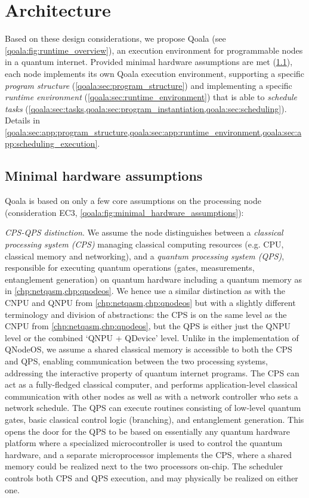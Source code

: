 \section{Architecture}
\label{qoala:sec:architecture}

Based on these design considerations, we propose Qoala (see \cref{qoala:fig:runtime_overview}), an execution environment for programmable nodes in a quantum internet. 
Provided minimal hardware assumptions are met (\cref{qoala:sec:minimal_hardware_assumptions}), 
each node implements its own Qoala execution environment, supporting a specific \textit{program structure} (\cref{qoala:sec:program_structure})
and implementing a specific \textit{runtime environment} (\cref{qoala:sec:runtime_environment}) that is able to \textit{schedule tasks} (\cref{qoala:sec:tasks,qoala:sec:program_instantiation,qoala:sec:scheduling}).
Details in \cref{qoala:sec:app:program_structure,qoala:sec:app:runtime_environment,qoala:sec:app:scheduling_execution}.

\subsection{Minimal hardware assumptions}
\label{qoala:sec:minimal_hardware_assumptions}

Qoala is based on only a few core assumptions on the processing node (consideration EC3, \cref{qoala:fig:minimal_hardware_assumptions}):

\textit{CPS-QPS distinction}. We assume the node distinguishes between a \textit{classical processing system (CPS)} managing classical computing resources (e.g. CPU, classical memory and networking), and a \textit{quantum processing system (QPS)}, responsible for executing quantum operations (gates, measurements, entanglement generation) on quantum hardware including a quantum memory as in \cref{chp:netqasm,chp:qnodeos}.
We hence use a similar distinction as with the CNPU and QNPU from \cref{chp:netqasm,chp:qnodeos} but with a slightly different terminology and division of abstractions:
the CPS is on the same level as the CNPU from \cref{chp:netqasm,chp:qnodeos}, but the QPS is either just the QNPU level or the combined `QNPU + QDevice' level.
Unlike in the implementation of QNodeOS, we assume a shared classical memory is accessible to both the CPS and QPS, enabling communication between the two processing systems, addressing the interactive property of quantum internet programs.
The CPS can act as a fully-fledged classical computer, and performs application-level classical communication with other nodes as well as with a network controller who sets a network schedule.
The QPS can execute routines consisting of low-level quantum gates, basic classical control logic (branching), and entanglement generation.
This opens the door for the QPS to be based on essentially any quantum hardware platform where a specialized microcontroller is used to control the quantum hardware, and a separate microprocessor implements the CPS, where a shared memory could be realized next to the two processors on-chip.
The scheduler controls both CPS and QPS execution, and may physically be realized on either one.

